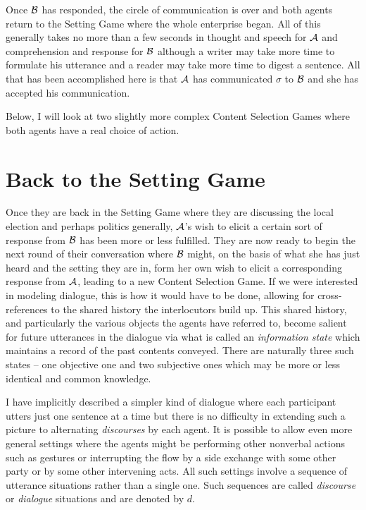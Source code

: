 Once $\cal B$ has responded, the circle of communication is over and both agents return to the Setting Game where the whole enterprise began. All of this generally takes no more than a few seconds in thought and speech for $\cal A$ and comprehension and response for $\cal B$ although a writer may take more time to formulate his utterance and a reader may take more time to digest a sentence. All that has been accomplished here is that $\cal A$ has communicated $\sigma$ to $\cal B$ and she has accepted his communication.

Below, I will look at two slightly more complex Content Selection Games where both agents have a real choice of action.


\section{Back to the Setting Game} \label{sec:setting game again}

Once they are back in the Setting Game where they are discussing the local election and perhaps politics generally, $\cal A$'s wish to elicit a certain sort of response from $\cal B$ has been more or less fulfilled. They are now ready to begin the next round of their conversation where $\cal B$ might, on the basis of what she has just heard and the setting they are in, form her own wish to elicit a corresponding response from $\cal A$, leading to a new Content Selection Game. If we were interested in modeling dialogue, this is how it would have to be done, allowing for cross-references to the shared history the interlocutors build up. This shared history, and particularly the various objects the agents have referred to, become salient for future utterances in the dialogue via what is called an \emph{information state} which maintains a record of the past contents conveyed. There are naturally three such states -- one objective one and two subjective ones which may be more or less identical and common knowledge. 

I have implicitly described a simpler kind of dialogue where each participant utters just one sentence at a time but there is no difficulty in extending such a picture to alternating \emph{discourses} by each agent. It is possible to allow even more general settings where the agents might be performing other nonverbal actions such as gestures or interrupting the flow by a side exchange with some other party or by some other intervening acts. All such settings involve a sequence of utterance situations rather than a single one. Such sequences are called \emph{discourse} or \emph{dialogue} situations and are denoted by $d$.

